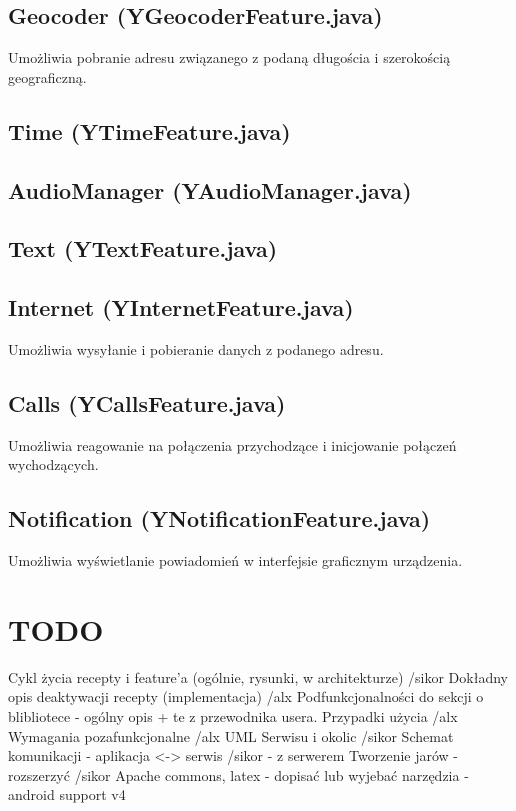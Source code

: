 \documentclass[11pt,a4paper,polish,thesis]{dcsbook}
\begin{document}
\subsection{Geocoder (YGeocoderFeature.java)}
Umożliwia pobranie adresu związanego z podaną długościa i szerokością geograficzną.

\subsection{Time (YTimeFeature.java)}

\subsection{AudioManager (YAudioManager.java)}

\subsection{Text (YTextFeature.java)}

\subsection{Internet (YInternetFeature.java)}
Umożliwia wysyłanie i pobieranie danych z podanego adresu.

\subsection{Calls (YCallsFeature.java)}
Umożliwia reagowanie na połączenia przychodzące i inicjowanie połączeń wychodzących.

\subsection{Notification (YNotificationFeature.java)}
Umożliwia wyświetlanie powiadomień w interfejsie graficznym urządzenia.

\section{TODO}
Cykl życia recepty i feature'a (ogólnie, rysunki, w architekturze) /sikor
Dokładny opis deaktywacji recepty (implementacja) /alx
Podfunkcjonalności do sekcji o blibliotece - ogólny opis + te z przewodnika usera. 
Przypadki użycia /alx
Wymagania pozafunkcjonalne /alx
UML Serwisu i okolic /sikor
Schemat komunikacji 
- aplikacja <-> serwis /sikor
- z serwerem 
Tworzenie jarów - rozszerzyć /sikor
Apache commons, latex - dopisać lub wyjebać
narzędzia - android support v4
\end{document}

